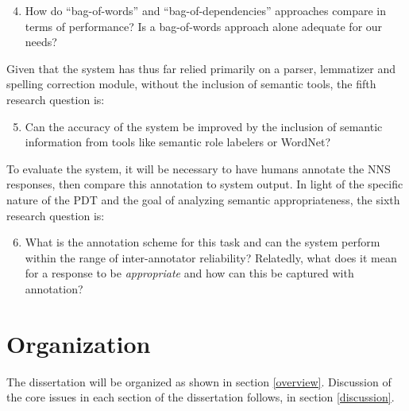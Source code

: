 \documentclass[11pt]{article}
\begin{document}
\begin{enumerate}\setcounter{enumi}{3}
\item{How do ``bag-of-words'' and ``bag-of-dependencies'' approaches compare in terms of performance? Is a bag-of-words approach alone adequate for our needs?}
\end{enumerate}
Given that the system has thus far relied primarily on a parser, lemmatizer and spelling correction module, without the inclusion of semantic tools, the fifth research question is: %

\begin{enumerate}\setcounter{enumi}{4}
\item{Can the accuracy of the system be improved by the inclusion of semantic information from tools like semantic role labelers or WordNet?}
\end{enumerate}
To evaluate the system, it will be necessary to have humans annotate the NNS responses, then compare this annotation to system output. In light of the specific nature of the PDT and the goal of analyzing semantic appropriateness, the sixth research question is:

\begin{enumerate}\setcounter{enumi}{5}
\item{What is the annotation scheme for this task and can the system perform within the range of inter-annotator reliability? Relatedly, what does it mean for a response to be \textit{appropriate} and how can this be captured with annotation?}
\end{enumerate}

\section{Organization}
The dissertation will be organized as shown in section \ref{overview}. Discussion of the core issues in each section of the dissertation follows, in section \ref{discussion}.
\end{document}
